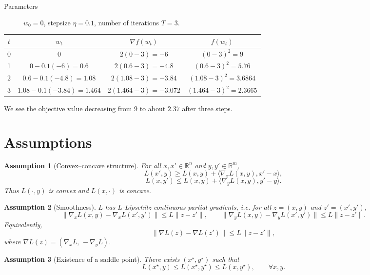 \documentclass{article}
\newtheorem{assumption}{Assumption}
\begin{document}
\begin{description}
\item[Parameters] $w_{0}=0$, stepsize $\eta=0.1$, number of iterations $T=3$.
\end{description}

\begin{center}
\begin{tabular}{c|c|c|c}
$t$ & $w_{t}$ & $\nabla f(w_{t})$ & $f(w_{t})$\\ \hline
0 & $0$ & $2(0-3)=-6$ & $(0-3)^{2}=9$\\
1 & $0-0.1(-6)=0.6$ & $2(0.6-3)=-4.8$ & $(0.6-3)^{2}=5.76$\\
2 & $0.6-0.1(-4.8)=1.08$ & $2(1.08-3)=-3.84$ & $(1.08-3)^{2}=3.6864$\\
3 & $1.08-0.1(-3.84)=1.464$ & $2(1.464-3)=-3.072$ & $(1.464-3)^{2}=2.3665$
\end{tabular}
\end{center}
We see the objective value decreasing from $9$ to about $2.37$ after three steps.

\newpage

\section*{Assumptions}
\begin{assumption}[Convex–concave structure]\label{ass:cc}
For all $x,x'\in\mathbb{R}^{n}$ and $y,y'\in\mathbb{R}^{m}$,
\[
L(x',y)\ge L(x,y)+\langle \nabla_{x}L(x,y),x'-x\rangle,
\]
\[
L(x,y')\le L(x,y)+\langle \nabla_{y}L(x,y),y'-y\rangle .
\]
Thus $L(\cdot ,y)$ is convex and $L(x,\cdot )$ is concave.
\end{assumption}

\begin{assumption}[Smoothness]\label{ass:smooth}
$L$ has $L$‑Lipschitz continuous partial gradients, i.e. for all $z=(x,y)$ and $z'=(x',y')$,
\[
\|\nabla_{x}L(x,y)-\nabla_{x}L(x',y')\|\le L\|z-z'\|,\qquad
\|\nabla_{y}L(x,y)-\nabla_{y}L(x',y')\|\le L\|z-z'\|.
\]
Equivalently,
\[
\|\nabla L(z)-\nabla L(z')\|\le L\|z-z'\|,
\]
where $\nabla L(z)=(\nabla_{x}L,\,-\nabla_{y}L)$.
\end{assumption}

\begin{assumption}[Existence of a saddle point]\label{ass:saddle}
There exists $(x^{\star},y^{\star})$ such that
\[
L(x^{\star},y)\le L(x^{\star},y^{\star})\le L(x,y^{\star}),\qquad\forall x,y.
\]
\end{assumption}
\end{document}
